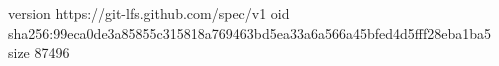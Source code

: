 version https://git-lfs.github.com/spec/v1
oid sha256:99eca0de3a85855c315818a769463bd5ea33a6a566a45bfed4d5fff28eba1ba5
size 87496
